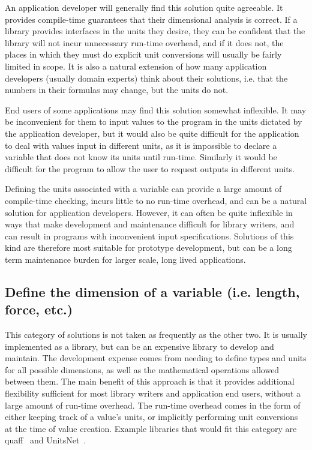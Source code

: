 \documentclass{article}
\begin{document}
An application developer will generally find this solution quite agreeable.
It provides compile-time guarantees that their dimensional analysis is correct.
If a library provides interfaces in the units they desire, they can be confident that the library will not incur unnecessary run-time overhead,
and if it does not, the places in which they must do explicit unit conversions will usually be fairly limited in scope.
It is also a natural extension of how many application developers (usually domain experts) think about their solutions,
i.e. that the numbers in their formulas may change, but the units do not.

End users of some applications may find this solution somewhat inflexible.
It may be inconvenient for them to input values to the program in the units dictated by the application developer,
but it would also be quite difficult for the application to deal with values input in different units,
as it is impossible to declare a variable that does not know its units until run-time.
Similarly it would be difficult for the program to allow the user to request outputs in different units.

Defining the units associated with a variable can provide a large amount of compile-time checking,
incurs little to no run-time overhead, and can be a natural solution for application developers.
However, it can often be quite inflexible in ways that make development and maintenance difficult for library writers,
and can result in programs with inconvenient input specifications.
Solutions of this kind are therefore most suitable for prototype development,
but can be a long term maintenance burden for larger scale, long lived applications.

\subsection{Define the dimension of a variable (i.e. length, force, etc.)}
\label{static-dimensions}

This category of solutions is not taken as frequently as the other two.
It is usually implemented as a library, but can be an expensive library to develop and maintain.
The development expense comes from needing to define types and units for all possible dimensions,
as well as the mathematical operations allowed between them.
The main benefit of this approach is that it provides additional flexibility sufficient for most library writers
and application end users, without a large amount of run-time overhead.
The run-time overhead comes in the form of either keeping track of a value's units,
or implicitly performing unit conversions at the time of value creation.
Example libraries that would fit this category are quaff~\cite{QuaffFortranPackage} and UnitsNet~\cite{Larsen2021}.
\end{document}
